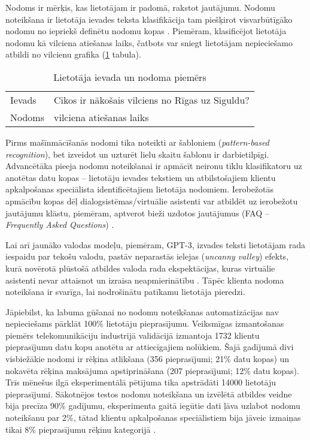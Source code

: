 Nodoms ir mērķis, kas lietotājam ir padomā, rakstot jautājumu. Nodomu noteikšana ir lietotāja ievades teksta klasifikācija tam piešķirot visvarbūtīgāko nodomu no iepriekš definētu nodomu kopas \cite{fasttext2019}. Piemēram, klasificējot lietotāja nodomu kā vilciena atiešanas laiks, čatbots var sniegt lietotājam nepieciešamo atbildi no vilcienu grafika (\ref{tab:input-intent} tabula).


\begin{table}[htbp]
	\centering
	\caption{Lietotāja ievada un nodoma piemērs}
	\begin{tabular}{ll}\toprule
		Ievads & Cikos ir nākošais vilciens no Rīgas uz Siguldu? \\
		Nodoms & vilciena atiešanas laiks \\\bottomrule
	\end{tabular}%
	\label{tab:input-intent}%
\end{table}

Pirms mašīnmācīšanās nodomi tika noteikti ar šabloniem (\textit{pattern-based recognition}), bet izveidot un uzturēt lielu skaitu šablonu ir darbietilpīgi. Advancētāka pieeja nodomu noteikšanai ir apmācīt neironu tīklu klasifikatoru uz anotētas datu kopas -- lietotāju ievades tekstiem un atbilstošajiem klientu apkalpošanas speciālista identificētajiem lietotāja nodomiem. Ierobežotās apmācību kopas dēļ dialogsistēmas/virtuālie asistenti var atbildēt uz ierobežotu jautājumu klāstu, piemēram, aptverot bieži uzdotos jautājumus (FAQ -- \textit{Frequently Asked Questions}) \cite{fasttext2019}.

Lai arī jaunāko valodas modeļu, piemēram, GPT-3, izvades teksti lietotājam rada iespaidu par tekošu valodu, pastāv neparastās ielejas (\textit{uncanny valley}) efekts, kurā novērotā plūstošā atbildes valoda rada ekspektācijas, kuras virtuālie asistenti nevar attaisnot un izraisa neapmierinātību \cite{paikens2020}. Tāpēc klienta nodoma noteikšana ir svarīga, lai nodrošinātu patīkamu lietotāja pieredzi.

Jāpiebilst, ka labuma gūšanai no nodomu noteikšanas automatizācijas nav nepieciešams pārklāt 100\% lietotāju pieprasījumu. Veiksmīgas izmantošanas piemērs telekomunikāciju industrijā validācijā izmantoja 1732 klientu pieprasījumu datu kopu anotētu ar attiecīgajiem nolūkiem. Šajā gadījumā divi visbiežākie nodomi ir rēķina atlikšana (356 pieprasījumi; 21\% datu kopas) un nokavēta rēķina maksājuma apstiprināšana (207 pieprasījumi; 12\% datu kopas). Trīs mēnešus ilgā eksperimentālā pētījuma tika apstrādāti 14000 lietotāju pieprasījumi. Sākotnējos testos nodomu noteikšana un izvēlētā atbildes veidne bija precīza 90\% gadījumu, eksperimenta gaitā iegūtie dati ļāva uzlabot nodomu noteikšanu par 2\%, tātad klientu apkalpošanas speciālistiem bija jāveic izmaiņas tikai 8\% pieprasījumu rēķinu kategorijā \cite{paikens2020}.

